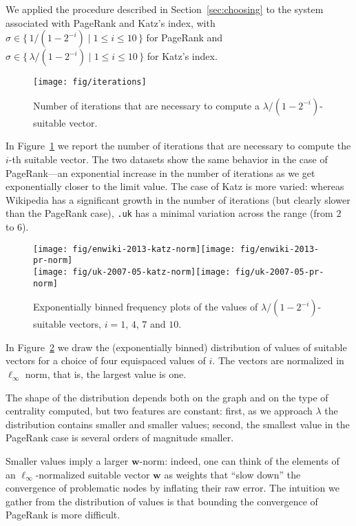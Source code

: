 \documentclass{article}
\newcommand{\w}{{\bm w}}
\newcommand{\1}{\mathbf 1}
\begin{document}
We applied the procedure described in Section~\ref{sec:choosing} to the system associated with PageRank
and Katz's index, with $\sigma\in\{\,1/(1-2^{-i})\mid 1\leq i\leq 10\,\}$ for PageRank and
$\sigma\in\{\,\lambda/(1-2^{-i})\mid 1\leq i\leq 10\,\}$ for Katz's index.

\begin{figure}
\centering
\texttt{[image: fig/iterations]}
\caption{\label{fig:iter}Number of iterations that are necessary to compute a $\lambda/(1-2^{-i})$-suitable vector.}
\end{figure}

In Figure~\ref{fig:iter} we report the number of iterations that are necessary to compute the $i$-th suitable
vector. The two datasets show the same behavior in the case of PageRank---an exponential
increase in the number of iterations as we get exponentially closer to the limit value. The case of Katz is more varied: whereas Wikipedia has a significant
growth in the number of iterations (but clearly slower than the PageRank case), \texttt{.uk} has a minimal variation 
across the range (from $2$ to $6$).  

\begin{figure}[htb]
\centering
\texttt{[image: fig/enwiki-2013-katz-norm]}\quad\texttt{[image: fig/enwiki-2013-pr-norm]}\\
\texttt{[image: fig/uk-2007-05-katz-norm]}\quad\texttt{[image: fig/uk-2007-05-pr-norm]}\\
\caption{\label{fig:norm}Exponentially binned frequency plots of the values of $\lambda/(1-2^{-i})$-suitable vectors, $i=1$, $4$, $7$ and $10$.}
\end{figure}


In Figure~\ref{fig:norm} we draw the (exponentially binned) distribution of values of suitable vectors for
a choice of four equispaced values of $i$. The vectors are normalized in $\ell_\infty$ norm, that is,
the largest value is one.

The shape of the distribution depends both on the graph
and on the type of centrality computed, but two features are constant: first, as we approach $\lambda$ the distribution
contains smaller and smaller values; second, the smallest value in the PageRank case is several orders of magnitude smaller.

Smaller values imply a larger $\w$-norm: indeed, one can think of the elements of an $\ell_\infty$-normalized suitable
vector $\w$ as weights that ``slow down'' the convergence of problematic nodes by inflating their raw error. The intuition
we gather from the distribution of values is that bounding the convergence of PageRank is more difficult. 
\end{document}
